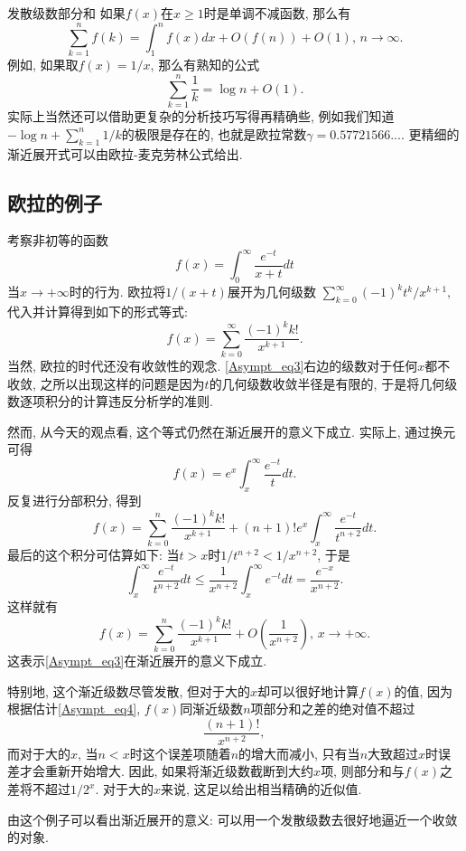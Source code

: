 \begin{example}{发散级数部分和}
如果$f(x)$在$x\geq1$时是单调不减函数, 那么有$$
\sum_{k=1}^nf(k)=\int_1^n f(x)dx+O(f(n))+O(1),\,n\to\infty.
$$
例如, 如果取$f(x)=1/x$, 那么有熟知的公式
$$
\sum_{k=1}^n\frac{1}{k}=\log n+O(1).
$$
实际上当然还可以借助更复杂的分析技巧写得再精确些, 例如我们知道$-\log n+\sum_{k=1}^n1/k$的极限是存在的, 也就是欧拉常数$\gamma=0.57721566...$. 更精细的渐近展开式可以由欧拉-麦克劳林公式给出.
\end{example}

\subsection{欧拉的例子}
考察非初等的函数
$$
f(x)=\int_0^\infty\frac{e^{-t}}{x+t}dt
$$
当$x\to+\infty$时的行为. 欧拉将$1/(x+t)$展开为几何级数
$
\sum_{k=0}^\infty {(-1)^kt^k}/{x^{k+1}},
$
代入并计算得到如下的形式等式:
\begin{equation}\label{Asympt_eq3}
f(x)=\sum_{k=0}^\infty\frac{(-1)^kk!}{x^{k+1}}.
\end{equation}
当然, 欧拉的时代还没有收敛性的观念. \autoref{Asympt_eq3}右边的级数对于任何$x$都不收敛, 之所以出现这样的问题是因为$t$的几何级数收敛半径是有限的, 于是将几何级数逐项积分的计算违反分析学的准则. 

然而, 从今天的观点看, 这个等式仍然在渐近展开的意义下成立. 实际上, 通过换元可得
$$
f(x)=e^{x}\int_x^\infty \frac{e^{-t}}{t}dt.
$$
反复进行分部积分, 得到
$$
f(x)=\sum_{k=0}^n\frac{(-1)^kk!}{x^{k+1}}
+(n+1)!e^x\int_x^\infty\frac{e^{-t}}{t^{n+2}}dt.
$$
最后的这个积分可估算如下: 当$t>x$时$1/t^{n+2}<1/x^{n+2}$, 于是
\begin{equation}\label{Asympt_eq4}
\int_x^\infty\frac{e^{-t}}{t^{n+2}}dt
\leq\frac{1}{x^{n+2}}\int_x^\infty e^{-t}dt
=\frac{e^{-x}}{x^{n+2}}.
\end{equation}
这样就有
$$
f(x)=\sum_{k=0}^n\frac{(-1)^kk!}{x^{k+1}}
+O\left(\frac{1}{x^{n+2}}\right),\,x\to+\infty.
$$
这表示\autoref{Asympt_eq3}在渐近展开的意义下成立. 

特别地, 这个渐近级数尽管发散, 但对于大的$x$却可以很好地计算$f(x)$的值, 因为根据估计\autoref{Asympt_eq4}, $f(x)$同渐近级数$n$项部分和之差的绝对值不超过
$$
\frac{(n+1)!}{x^{n+2}},
$$
而对于大的$x$, 当$n<x$时这个误差项随着$n$的增大而减小, 只有当$n$大致超过$x$时误差才会重新开始增大. 因此, 如果将渐近级数截断到大约$x$项, 则部分和与$f(x)$之差将不超过$1/2^x$. 对于大的$x$来说, 这足以给出相当精确的近似值. 

由这个例子可以看出渐近展开的意义: 可以用一个发散级数去很好地逼近一个收敛的对象.